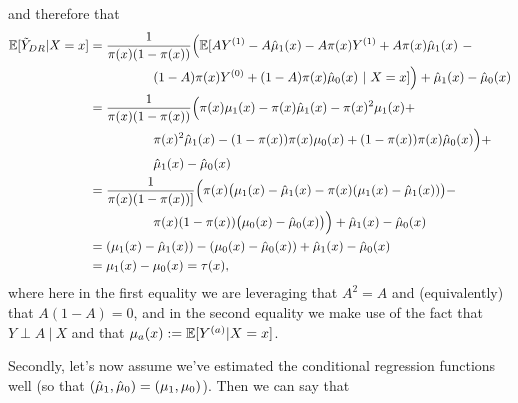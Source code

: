 \documentclass[../thesis.tex]{subfiles}
\begin{document}
and therefore that
\begin{align*}
    \mathbb{E}[\Tilde{Y}_{DR} | X=x]  & = \frac{1}{\pi(x)(1-\pi(x))} \Big(\mathbb{E}[AY^{(1)} - A\hat{\mu}_1(x) - A\pi(x)Y^{(1)} + A\pi(x)\hat{\mu}_1(x) \ - \\
    & \hspace{50pt} (1-A)\pi(x)Y^{(0)} + (1-A)\pi(x)\hat{\mu}_0(x) \ | \ X=x ] \Big) + \hat{\mu}_1(x) - \hat{\mu}_0(x) \\ 
    & = \frac{1}{\pi(x)(1-\pi(x))} \Big( \pi(x)\mu_1(x) - \pi(x)\hat{\mu}_1(x) - \pi(x)^2\mu_1(x) + \\
    & \hspace{50pt} \pi(x)^2\hat{\mu}_1(x) - (1-\pi(x))\pi(x)\mu_0(x) + (1-\pi(x))\pi(x) \hat{\mu}_0(x) \Big) + \\
    & \hspace{50pt} \hat{\mu}_1(x) - \hat{\mu}_0(x) \\
    & = \frac{1}{\pi(x)(1-\pi(x))]} \Big( \pi(x)\big(\mu_1(x) - \hat{\mu}_1(x) - \pi(x)(\mu_1(x) - \hat{\mu}_1(x)) \big) - \\
    & \hspace{50pt} \pi(x)(1-\pi(x))\big( \mu_0(x) - \hat{\mu}_0(x) \big) \Big) + \hat{\mu}_1(x) - \hat{\mu}_0(x) \\
    & = (\mu_1(x) - \hat{\mu}_1(x)) - (\mu_0(x) - \hat{\mu}_0(x)) + \hat{\mu}_1(x) - \hat{\mu}_0(x) \\ 
    &= \mu_1(x) - \mu_0(x) = \tau(x),
\end{align*}
where here in the first equality we are leveraging that $A^2 = A$ and (equivalently) that $A(1-A) = 0$, and in the second equality we make use of the fact that $Y\perp A \ | \ X$ and that $\mu_a(x) := \mathbb{E}[Y^{(a)}|X=x]$.

Secondly, let's now assume we've estimated the conditional regression functions well (so that $(\hat{\mu}_1, \hat{\mu}_0) = (\mu_1, \mu_0)$). Then we can say that 
\end{document}

